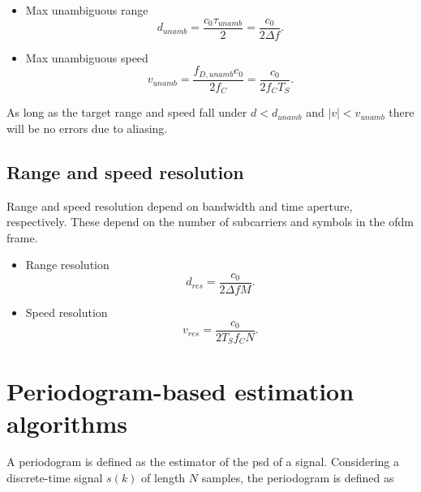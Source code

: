         \begin{itemize}
            \item Max unambiguous range
            \begin{equation}
            	d_{unamb} = \frac{c_0 \tau_{unamb}}{2} = \frac{c_0}{2\Delta f}.
            \end{equation}
            \item Max unambiguous speed
            \begin{equation}
				v_{unamb} = \frac{f_{D,unamb} c_0}{2f_C} = \frac{c_0}{2f_C T_S}.
			\end{equation}
        \end{itemize}
        
        As long as the target range and speed fall under $d < d_{unamb}$ and $|v| < v_{unamb}$ there will be no errors due to aliasing.
        
    \subsection{Range and speed resolution}
    
        Range and speed resolution depend on bandwidth and time aperture, respectively. These depend on the number of subcarriers and symbols in the \gls{ofdm} frame.
        
        \begin{itemize}
            \item Range resolution
            \begin{equation}
            	d_{res} =  \frac{c_0}{2\Delta f M}.
            \end{equation}
            \item Speed resolution
            \begin{equation}
            	v_{res} = \frac{c_0}{2 T_S f_C N}.
            \end{equation}
        \end{itemize}
        

        
\section{Periodogram-based estimation algorithms}
    
    A periodogram is defined as the estimator of the \gls{psd} of a signal.
    Considering a discrete-time signal $s(k)$ of length $N$ samples, the periodogram is defined as
    

